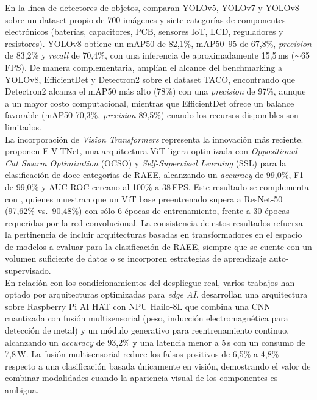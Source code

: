 En la línea de detectores de objetos, \cite{rajeevAdvancingEwasteClassification2025a} comparan YOLOv5, YOLOv7 y YOLOv8 sobre un dataset propio de 700 imágenes y siete categorías de componentes electrónicos (baterías, capacitores, PCB, sensores IoT, LCD, reguladores y resistores). YOLOv8 obtiene un mAP50 de 82{,}1\%, mAP50--95 de 67{,}8\%, \textit{precision} de 83{,}2\% y \textit{recall} de 70{,}4\%, con una inferencia de aproximadamente 15{,}5\,ms (\(\sim\)65\,FPS). De manera complementaria, \cite{midigudlaComparativeAnalysisDeep2025} amplían el alcance del benchmarking a YOLOv8, EfficientDet y Detectron2 sobre el dataset TACO, encontrando que Detectron2 alcanza el mAP50 más alto (78\%) con una \textit{precision} de 97\%, aunque a un mayor costo computacional, mientras que EfficientDet ofrece un balance favorable (mAP50 70{,}3\%, \textit{precision} 89{,}5\%) cuando los recursos disponibles son limitados.\\

La incorporación de \textit{Vision Transformers} representa la innovación más reciente. \cite{oiseEViTNetLightweightVision2026} proponen E-ViTNet, una arquitectura ViT ligera optimizada con \textit{Oppositional Cat Swarm Optimization} (OCSO) y \textit{Self-Supervised Learning} (SSL) para la clasificación de doce categorías de RAEE, alcanzando un \textit{accuracy} de 99{,}0\%, F1 de 99{,}0\% y AUC-ROC cercano al 100\% a 38\,FPS. Este resultado se complementa con \cite{donmez_benchmarking_2025}, quienes muestran que un ViT base preentrenado supera a ResNet-50 (97{,}62\% vs.\ 90{,}48\%) con sólo 6 épocas de entrenamiento, frente a 30 épocas requeridas por la red convolucional. La consistencia de estos resultados refuerza la pertinencia de incluir arquitecturas basadas en transformadores en el espacio de modelos a evaluar para la clasificación de RAEE, siempre que se cuente con un volumen suficiente de datos o se incorporen estrategias de aprendizaje auto-supervisado.\\

En relación con los condicionamientos del despliegue real, varios trabajos han optado por arquitecturas optimizadas para \textit{edge AI}. \cite{p.sLowPowerEdgeAI2026} desarrollan una arquitectura sobre Raspberry Pi AI HAT con NPU Hailo-8L que combina una CNN cuantizada con fusión multisensorial (peso, inducción electromagnética para detección de metal) y un módulo generativo para reentrenamiento continuo, alcanzando un \textit{accuracy} de 93{,}2\% y una latencia menor a 5\,s con un consumo de 7{,}8\,W. La fusión multisensorial reduce los falsos positivos de 6{,}5\% a 4{,}8\% respecto a una clasificación basada únicamente en visión, demostrando el valor de combinar modalidades cuando la apariencia visual de los componentes es ambigua.\\

